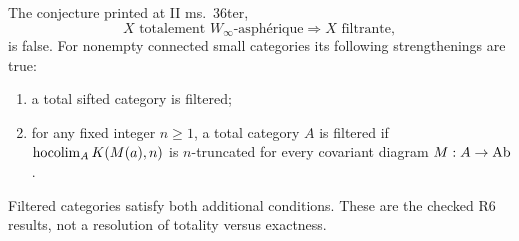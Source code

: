 \begin{proposition}
\label{D:manuscript-II}
The conjecture printed at II ms.\ 36ter,
\[
 X\text{ totalement }W_\infty\text{-asph\'erique}
 \Longrightarrow X\text{ filtrante},
\]
is false. For nonempty connected small categories its following
strengthenings are true:
\begin{enumerate}[label=(\roman*)]
\item a total sifted category is filtered;
\item for any fixed integer $n\geq1$, a total category $A$ is filtered
if $\operatorname*{hocolim}_A K(M(a),n)$ is $n$-truncated for every covariant diagram
$M:A\to\mathrm{Ab}$.
\end{enumerate}
Filtered categories satisfy both additional conditions. These are the
checked R6 results, not a resolution of totality versus exactness.
\end{proposition}
